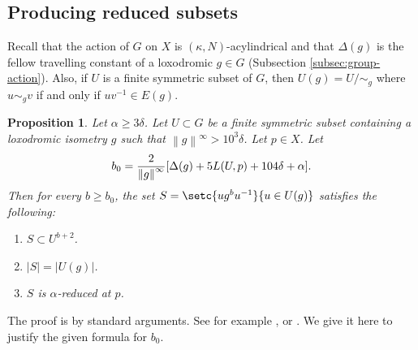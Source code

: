 \documentclass[leqno,a4paper,10pt]{amsart}
\theoremstyle{plain}
\newtheorem{prop}[thm]{Proposition}
\theoremstyle{definition}
\theoremstyle{remark}
\renewcommand{\geq}{\geqslant}
\let\le\leqslant
\let\ge\geqslant
\let\geq\geqslant
\newcommand{\zinterval}[2]{
	\mathchoice%
	{\left \llbracket #1, \cdots, #2 \right \rrbracket}%
	{\llbracket #1, #2 \rrbracket}%
	{\llbracket #1, #2 \rrbracket}%
	{\llbracket #1, #2 \rrbracket}%
}
\newcommand{\stlen}[1]{
	\left\| #1\right\|^{\infty}
}
\begin{document}
	\subsection{Producing reduced subsets}

Recall that the action of $G$ on $X$ is $(\kappa,N)$-acylindrical and that $\Delta(g)$ is the fellow travelling constant of a loxodromic $g\in G$ (Subsection \ref{subsec:group-action}). Also, if $U$ is a finite symmetric subset of $G$, then $U(g)=U/\sim_g$ where $u\sim_gv$ if and only if $uv^{-1}\in E(g)$.  

\begin{prop}
		\label{prop:producing-reduced-subsets}	
	Let $\alpha\geq 3 \delta$. Let $U\subset G$ be a finite symmetric subset containing a loxodromic isometry $g$ such that $\stlen{g}>10^3\delta$.  Let $p\in X$. Let
	$$b_0 = \frac{2}{\stlen{g}} \qty [\Delta(g)+5L(U,p)+104\delta+\alpha ].$$
	Then for every $b\ge b_0$, the set $S=\setc{ug^bu^{-1}}{u\in U(g)}$ satisfies the following: 
	\begin{enumerate}
		\item $S\subset U^{b+2}$. 
		\item $|S|=|U(g)|$.
		\item $S$ is $\alpha$-reduced at $p$.
	\end{enumerate}
	
\end{prop}
The proof is by standard arguments. See for example \cite{koubi_croissance_1998}, \cite{arzhantseva_lower_2006} or \cite{fujiwara_rates_2021}.  We give it here to justify the given formula for $b_0$.
%	
%	
%	
\end{document}
